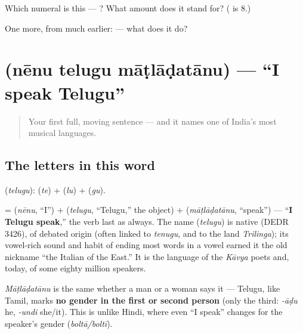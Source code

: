 \begin{tcolorbox}[breakable,colback=teal!4,colframe=teal!35!black,title={Before you move on}]
Which numeral is this — ? What amount does it stand for? ( is 8.)

One more, from much earlier:  — what does it do?
\end{tcolorbox}
\section[\texorpdfstring{\te{నేను} \te{తెలుగు} \te{మాట్లాడతాను} (nēnu telugu …)}{నేను తెలుగు మాట్లాడతాను (nēnu telugu …)}]{   (nēnu telugu māṭlāḍatānu) — \textquotedblleft{}I speak Telugu\textquotedblright{}}

\label{lesson:TE-C05-nenu-telugu-maatlaadataanu}



\begin{quote}
Your first full, moving sentence — and it names one of India's most musical languages.
\end{quote}

\subsection*{The letters in this word}
\textbf{} (\emph{telugu}): \textbf{} (\emph{te}) + \textbf{} (\emph{lu}) + \textbf{} (\emph{gu}).

\begin{cousinweb}
\textbf{  } = \textbf{} (\emph{nēnu}, \textquotedblleft{}I\textquotedblright{}) + \textbf{} (\emph{telugu}, \textquotedblleft{}Telugu,\textquotedblright{} the object) + \textbf{} (\emph{māṭlāḍatānu}, \textquotedblleft{}speak\textquotedblright{}) — \textquotedblleft{}\textbf{I Telugu speak},\textquotedblright{} the verb last as always. The name \textbf{} (\emph{telugu}) is native (DEDR 3426), of debated origin (often linked to \emph{tenugu}, and to the land \emph{Trilinga}); its vowel-rich sound and habit of ending most words in a vowel earned it the old nickname \textquotedblleft{}the Italian of the East.\textquotedblright{} It is the language of the \emph{Kāvya} poets and, today, of some eighty million speakers.
\end{cousinweb}

\begin{grammarlens}[title={Grammar Lens: no gender on \textquotedblleft{}I speak\textquotedblright{}}]
\emph{Māṭlāḍatānu} is the same whether a man or a woman says it — Telugu, like Tamil, marks \textbf{no gender in the first or second person} (only the third: \emph{-āḍu} he, \emph{-undi} she/it). This is unlike Hindi, where even \textquotedblleft{}I speak\textquotedblright{} changes for the speaker's gender (\emph{boltā/boltī}).
\end{grammarlens}

